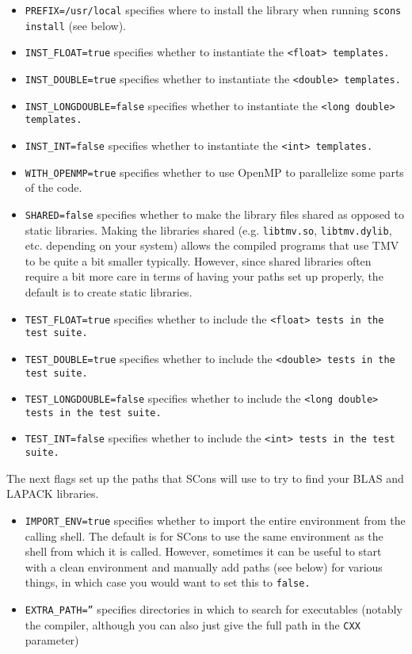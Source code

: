 \begin{enumerate}
\begin{itemize}
\item \texttt{PREFIX=/usr/local} specifies where to install the library when running \texttt{scons install} (see below).
\item \texttt{INST\_FLOAT=true} specifies whether to instantiate the \tt{<float>} templates.
\item \texttt{INST\_DOUBLE=true} specifies whether to instantiate the \tt{<double>} templates.
\item \texttt{INST\_LONGDOUBLE=false} specifies whether to instantiate the \tt{<long double>} templates.
\item \texttt{INST\_INT=false} specifies whether to instantiate the \tt{<int>} templates.
\item \texttt{WITH\_OPENMP=true} specifies whether to use OpenMP to parallelize some parts of the code.
\item \texttt{SHARED=false} specifies whether to make the library files shared as opposed to static libraries.  Making the libraries shared (e.g. \texttt{libtmv.so}, \texttt{libtmv.dylib}, etc. depending on your system) allows the compiled programs that use TMV to be quite a bit smaller typically.  However, since shared libraries often require a bit more care in terms of having your paths set up properly, the default is to create static libraries.
\item \texttt{TEST\_FLOAT=true} specifies whether to include the \tt{<float>} tests in the test suite.
\item \texttt{TEST\_DOUBLE=true} specifies whether to include the \tt{<double>} tests in the test suite.
\item \texttt{TEST\_LONGDOUBLE=false} specifies whether to include the \tt{<long double>} tests in the test suite.
\item \texttt{TEST\_INT=false} specifies whether to include the \tt{<int>} tests in the test suite.
\end{itemize}
The next flags set up the paths that SCons will use to try to find your BLAS and LAPACK libraries.
\begin{itemize}
\item \texttt{IMPORT\_ENV=true} specifies whether to import the entire environment from the calling shell.
The default is for SCons to use the same environment as the shell from which it is called.  However, sometimes it can be useful to start with a clean environment and manually add paths (see below) for various things, in which case you would want to set this to \tt{false}.
\item \texttt{EXTRA\_PATH=''} specifies directories in which to search for executables (notably the compiler, although you can also just give the full path in the \texttt{CXX} parameter)

\end{itemize}
\end{enumerate}
